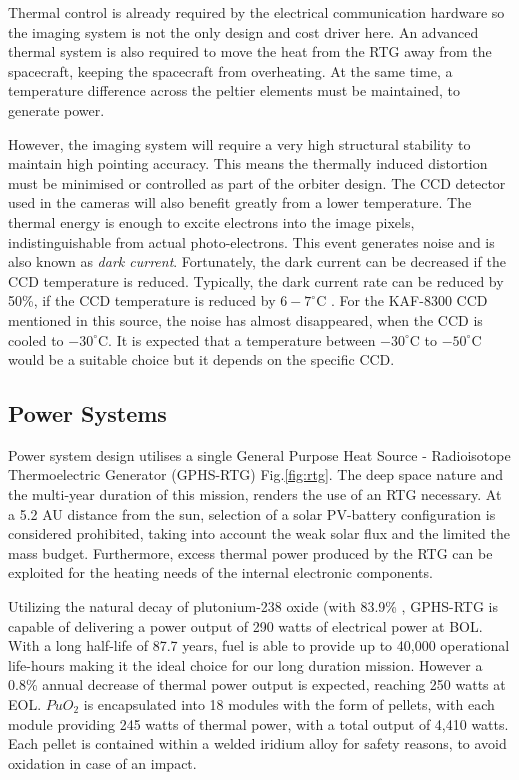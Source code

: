 Thermal control is already required by the electrical communication hardware so the imaging system is not the only design and cost driver here. An advanced thermal system is also required to move the heat from the RTG away from the spacecraft, keeping the spacecraft from overheating. At the same time, a temperature difference across the peltier elements must be maintained, to generate power. 

However, the imaging system will require a very high structural stability to maintain high pointing accuracy. This means the thermally induced distortion must be minimised or controlled as part of the orbiter design. The CCD detector used in the cameras will also benefit greatly from a lower temperature. The thermal energy is enough to excite electrons into the image pixels, indistinguishable from actual photo-electrons. This event generates noise and is also known as \textit{dark current}. Fortunately, the dark current can be decreased if the CCD temperature is reduced. Typically, the dark current rate can be reduced by 50\%, if the CCD temperature is reduced by $6-7^\circ$C \cite{sbig2014}. For the KAF-8300 CCD mentioned in this source, the noise has almost disappeared, when the CCD is cooled to $-30^\circ$C. It is expected that a temperature between $-30^\circ$C to $-50^\circ$C would be a suitable choice but it depends on the specific CCD.
\subsection{Power Systems}
Power system design utilises a single General Purpose Heat Source - Radioisotope Thermoelectric Generator (GPHS-RTG) Fig.\ref{fig:rtg}. The deep space nature and the multi-year duration of this mission, renders the use of an RTG necessary. At a 5.2 AU distance from the sun, selection of a solar PV-battery configuration is considered prohibited, taking into account the weak solar flux and the limited the mass budget. Furthermore, excess thermal power produced by the RTG can be exploited for the heating needs of the internal electronic components.

Utilizing the natural decay of plutonium-238 oxide (with 83.9\% , GPHS-RTG is capable of delivering a power output of 290 watts of electrical power at BOL. With a long half-life of 87.7 years, fuel is able to provide up to 40,000 operational life-hours making it the ideal choice for our long duration mission. However a 0.8\% annual decrease of thermal power output is expected, reaching 250 watts at EOL. $PuO_2$ is encapsulated into 18 modules with the form of pellets, with each module providing 245 watts of thermal power, with a total output of 4,410 watts. Each pellet is contained within a welded iridium alloy for safety reasons, to avoid oxidation in case of an impact. 

